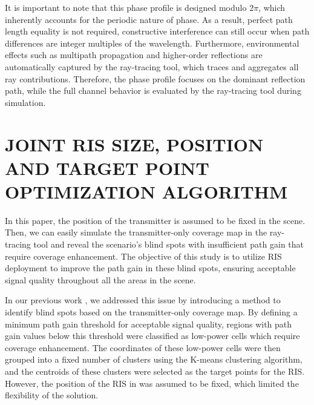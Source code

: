\documentclass{IEEEoj}
\begin{document}
It is important to note that this phase profile is designed modulo $2\pi$, which inherently accounts for the periodic nature of phase. As a result, perfect path length equality is not required, constructive interference can still occur when path differences are integer multiples of the wavelength. Furthermore, environmental effects such as multipath propagation and higher-order reflections are automatically captured by the ray-tracing tool, which traces and aggregates all ray contributions. Therefore, the phase profile focuses on the dominant reflection path, while the full channel behavior is evaluated by the ray-tracing tool during simulation.

\section{JOINT RIS SIZE, POSITION AND TARGET POINT OPTIMIZATION ALGORITHM} \label{algo_section}
In this paper, the position of the transmitter is assumed to be fixed in the scene. Then, we can easily simulate the transmitter-only coverage map in the ray-tracing tool and reveal the scenario's blind spots with insufficient path gain that require coverage enhancement. The objective of this study is to utilize RIS deployment to improve the path gain in these blind spots, ensuring acceptable signal quality throughout all the areas in the scene.

In our previous work \cite{emre_claude_eucap_paper}, we addressed this issue by introducing a method to identify blind spots based on the transmitter-only coverage map. By defining a minimum path gain threshold for acceptable signal quality, regions with path gain values below this threshold were classified as low-power cells which require coverage enhancement. The coordinates of these low-power cells were then grouped into a fixed number of clusters using the K-means clustering algorithm, and the centroids of these clusters were selected as the target points for the RIS. However, the position of the RIS in \cite{emre_claude_eucap_paper} was assumed to be fixed, which limited the flexibility of the solution.
\end{document}
